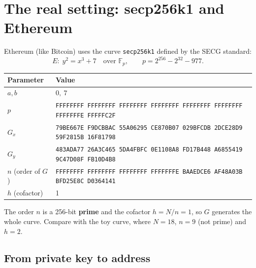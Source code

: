 
\section{The real setting: secp256k1 and Ethereum}

Ethereum (like Bitcoin) uses the curve \texttt{secp256k1} defined by the SECG standard:
\[
  E:\; y^2 = x^3 + 7 \quad \text{over } \mathbb{F}_p, \qquad p = 2^{256} - 2^{32} - 977 .
\]

\begin{center}
  \footnotesize
  \begin{tabular}{l l}
    \toprule
    Parameter & Value \\
    \midrule
    $a, b$ & $0,\ 7$ \\
    $p$ & \texttt{FFFFFFFF FFFFFFFF FFFFFFFF FFFFFFFF FFFFFFFF FFFFFFFF FFFFFFFE FFFFFC2F} \\
    $G_x$ & \texttt{79BE667E F9DCBBAC 55A06295 CE870B07 029BFCDB 2DCE28D9 59F2815B 16F81798} \\
    $G_y$ & \texttt{483ADA77 26A3C465 5DA4FBFC 0E1108A8 FD17B448 A6855419 9C47D08F FB10D4B8} \\
    $n$ (order of $G$) & \texttt{FFFFFFFF FFFFFFFF FFFFFFFF FFFFFFFE BAAEDCE6 AF48A03B BFD25E8C D0364141} \\
    $h$ (cofactor) & 1 \\
    \bottomrule
  \end{tabular}
\end{center}

The order $n$ is a 256-bit \textbf{prime} and the cofactor $h = N/n = 1$, so $G$ generates the whole curve. Compare with the toy curve, where $N = 18$, $n = 9$ (not prime) and $h = 2$.

\subsection{From private key to address}

